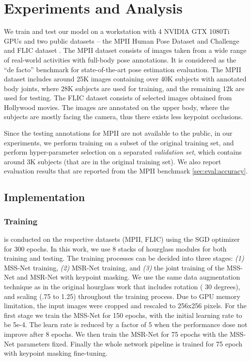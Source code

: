 \documentclass[runningheads]{llncs}
\begin{document}
\section{Experiments and Analysis}
\label{sec:exp}




We train and test our model on a workstation with 4 NVIDIA GTX 1080Ti GPUs and two public datasets -- the MPII Human Pose Dataset and Challenge \cite{andriluka14cvpr} and FLIC dataset \cite{Sapp:Taskar:MODEC:CVPR2013}.
The MPII dataset consists of images taken from a wide range of real-world activities with full-body pose annotations. It is considered as the ``de facto'' benchmark for state-of-the-art pose estimation evaluation.
The MPII dataset includes around 25K images containing over 40K subjects with annotated body joints, where 28K subjects are used for training, and the remaining 12k are used for testing. The FLIC dataset consists of  selected images obtained from Hollywood movies. The images are annotated on the upper body, where the subjects are mostly facing the camera, thus there exists less keypoint occlusions.

Since the testing annotations for MPII are not available to the public, in our experiments, we perform training on a subset of the original training set, and perform hyper-parameter selection on a separated {\em validation set}, which contains around 3K subjects (that are in the original training set). We also report evaluation results that are reported from the MPII benchmark \ref{sec:eval:accuracy}.
 
\subsection{Implementation}


\subsubsection{Training} 
is conducted on the respective datasets (MPII, FLIC) using the SGD optimizer for 300 epochs. In this work, we use 8 stacks of hourglass modules for both training and testing. The training processes can be decided into three stages: {\em (1)} MSS-Net training, {\em (2)} MSR-Net training, and {\em (3)} the joint training of the MSS-Net and MSR-Net with keypoint masking. 
We use the same data augmentation technique as in the original hourglass work \cite{newell2016stacked} that includes rotation ( 30 degrees), and scaling (.75 to 1.25) throughout the training process. 
Due to GPU memory limitation, the input images were cropped and rescaled to 256x256 pixels. For the first stage we train the MSS-Net for 150 epochs, with the initial learning rate to be 5e-4.
The learn rate is reduced by a factor of 5 when the performance dose not improve after 8 epochs. 
We then train the MSR-Net for 75 epochs with the MSS-Net parameters fixed. 
Finally the whole network pipeline is trained for 75 epoch with keypoint masking fine-tuning.  
\end{document}
